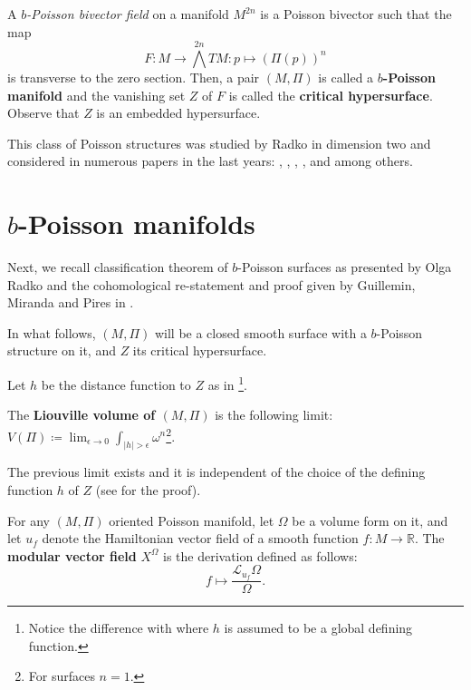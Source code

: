 A {\emph{$b$-Poisson {bivector field}}} on a manifold $M^{2n}$ is a Poisson bivector such that the map
\begin{equation}\label{eq:transverse}
F: M \rightarrow \bigwedge^{2n} TM: p \mapsto (\Pi(p))^n
\end{equation}
is transverse to the zero section. Then, a pair $(M,\Pi)$ is called a \textbf{$b$-Poisson manifold} and the vanishing set $Z$ of $F$ is called the \textbf{critical hypersurface}. {Observe that $Z$ is an embedded hypersurface}.



This class of Poisson structures was studied by Radko \cite{Radko02} in dimension two and considered in numerous papers in the last years: \cite{GMP10}, \cite{GMP14}, \cite{GMP15}, \cite{GMW17}, \cite{MO2} and  \cite{GUAL14}  among others.

\section{$b$-Poisson manifolds}

Next, we recall classification theorem of $b$-Poisson surfaces as presented by Olga Radko and  the cohomological re-statement and proof given by Guillemin, Miranda and Pires in \cite{GMP14}.

{ In what follows, $(M,\Pi)$  will be a closed smooth surface with a $b$-Poisson structure on it, and  $Z$  its critical hypersurface.}

{Let $h$ be the distance function to $Z$ as in \cite{MO2}}\footnote{{Notice the difference with \cite{Radko02} where $h$ is assumed to be a global defining function.}}.

\begin{definition}\label{lvol} The {\textbf{Liouville volume of $(M, \Pi)$}}  is the following limit: $ V(\Pi )\coloneqq \lim _{\epsilon \to 0}\int _{|h|>\epsilon }\omega^n $\footnote{{For surfaces $n = 1$.}}.
\end{definition}

{
The previous limit exists and it is independent of the choice of the defining function $h$ of $Z$ (see \cite{Radko02} for the proof).}

\begin{definition}
{For any $(M,{\Pi})$ oriented Poisson manifold, let $\Omega$} {be} a volume form on it, and let $u_f$ denote the Hamiltonian vector field of a smooth function $f:M\rightarrow\mathbb{R}$. The \textbf{modular vector field} {$X^{\Omega}$} is the derivation defined as follows:
	$$f\mapsto \frac{\mathcal{L}_{u_f}\Omega}{\Omega}.$$
\end{definition}	
	
